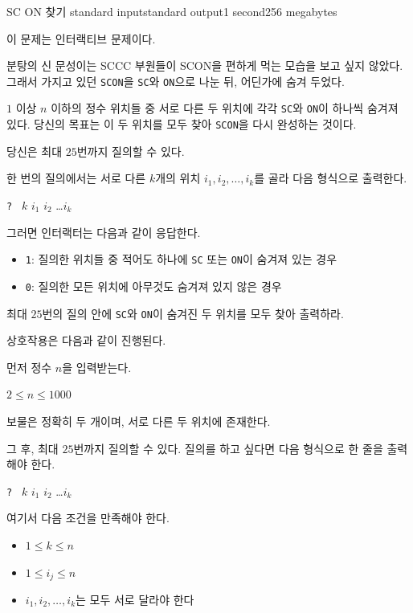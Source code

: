 \begin{problem}{SC ON 찾기 }{standard input}{standard output}{1 second}{256 megabytes}

이 문제는 인터랙티브 문제이다.

분탕의 신 문성이는 SCCC 부원들이 SCON을 편하게 먹는 모습을 보고 싶지 않았다.
그래서 가지고 있던 \texttt{SCON}을 \texttt{SC}와 \texttt{ON}으로 나눈 뒤, 어딘가에 숨겨 두었다.

$1$ 이상 $n$ 이하의 정수 위치들 중 서로 다른 두 위치에 각각 \texttt{SC}와 \texttt{ON}이 하나씩 숨겨져 있다.
당신의 목표는 이 두 위치를 모두 찾아 \texttt{SCON}을 다시 완성하는 것이다.

당신은 최대 $25$번까지 질의할 수 있다.

한 번의 질의에서는 서로 다른 $k$개의 위치
$i_1, i_2, \dots, i_k$를 골라 다음 형식으로 출력한다.
\begin{center}
\texttt{? } $k$ $i_1$ $i_2$ \dots $i_k$
\end{center}

그러면 인터랙터는 다음과 같이 응답한다.
\begin{itemize}
\item \texttt{1}: 질의한 위치들 중 적어도 하나에 \texttt{SC} 또는 \texttt{ON}이 숨겨져 있는 경우
\item \texttt{0}: 질의한 모든 위치에 아무것도 숨겨져 있지 않은 경우
\end{itemize}

최대 $25$번의 질의 안에 \texttt{SC}와 \texttt{ON}이 숨겨진 두 위치를 모두 찾아 출력하라.

\Interaction
상호작용은 다음과 같이 진행된다.

먼저 정수 $n$을 입력받는다.

\begin{center}
$2 \le n \le 1000$
\end{center}

보물은 정확히 두 개이며, 서로 다른 두 위치에 존재한다.

그 후, 최대 $25$번까지 질의할 수 있다.
질의를 하고 싶다면 다음 형식으로 한 줄을 출력해야 한다.
\begin{center}
\texttt{? } $k$ $i_1$ $i_2$ \dots $i_k$
\end{center}

여기서 다음 조건을 만족해야 한다.
\begin{itemize}
\item $1 \le k \le n$
\item $1 \le i_j \le n$
\item $i_1, i_2, \dots, i_k$는 모두 서로 달라야 한다
\end{itemize}


\end{problem}

